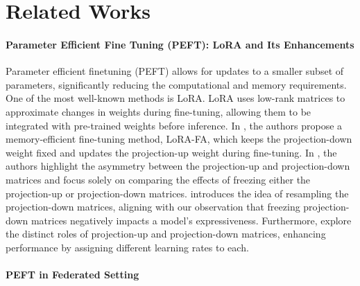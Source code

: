 \section{Related Works}
\label{related-works}
\paragraph{Parameter Efficient Fine Tuning (PEFT): LoRA and Its Enhancements}
 Parameter efficient finetuning (PEFT) allows for updates to a smaller subset of parameters, significantly reducing the computational and memory requirements. One of the most well-known methods is LoRA\cite{hu2021lora}.
LoRA uses low-rank matrices to approximate changes in weights during fine-tuning, allowing them to be integrated with pre-trained weights before inference. In \cite{zhang2023lorafa}, the authors propose a memory-efficient fine-tuning method, LoRA-FA, which keeps the projection-down weight fixed and updates the projection-up weight during fine-tuning. In \cite{zhu2024asymmetrylowrankadaptersfoundation}, the authors highlight the asymmetry between the projection-up and projection-down matrices and focus solely on comparing the effects of freezing either the projection-up or projection-down matrices. \cite{hao2024floralowrankadapterssecretly} introduces the idea of resampling the projection-down matrices, aligning with our observation that freezing projection-down matrices negatively impacts a model's expressiveness. Furthermore, \cite{hayou2024lora} explore the distinct roles of projection-up and projection-down matrices, enhancing performance by assigning different learning rates to each. 
\paragraph{PEFT in Federated Setting}

